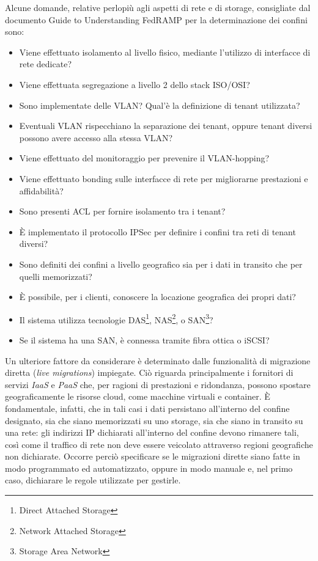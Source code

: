 \documentclass[../main.tex]{subfiles}
\begin{document}
Alcune domande, relative perlopiù agli aspetti di rete e di storage, consigliate dal documento Guide to Understanding FedRAMP per la determinazione dei confini sono:
\begin{itemize}
    \item Viene effettuato isolamento al livello fisico, mediante l'utilizzo di interfacce di rete dedicate?
    \item Viene effettuata segregazione a livello 2 dello stack ISO/OSI?
    \item Sono implementate delle VLAN? Qual'è la definizione di tenant utilizzata?
    \item Eventuali VLAN rispecchiano la separazione dei tenant, oppure tenant diversi possono avere accesso alla stessa VLAN?
    \item Viene effettuato del monitoraggio per prevenire il VLAN-hopping?
    \item Viene effettuato bonding sulle interfacce di rete per migliorarne prestazioni e affidabilità?
    \item Sono presenti ACL per fornire isolamento tra i tenant?
    \item È implementato il protocollo IPSec per definire i confini tra reti di tenant diversi?
    \item Sono definiti dei confini a livello geografico sia per i dati in transito che per quelli memorizzati?
    \item È possibile, per i clienti, conoscere la locazione geografica dei propri dati?
    \item Il sistema utilizza tecnologie DAS\footnote{Direct Attached Storage}, NAS\footnote{Network Attached Storage}, o SAN\footnote{Storage Area Network}?
    \item Se il sistema ha una SAN, è connessa tramite fibra ottica o iSCSI?
\end{itemize} 
        
Un ulteriore fattore da considerare è determinato dalle funzionalità di migrazione diretta (\textit{live migrations}) impiegate. Ciò riguarda principalmente i fornitori di servizi \textit{IaaS} e \textit{PaaS} che, per ragioni di prestazioni e ridondanza, possono spostare geograficamente le risorse cloud, come macchine virtuali e container.
È fondamentale, infatti, che in tali casi i dati persistano all'interno del confine designato, sia che siano memorizzati su uno storage, sia che siano in transito su una rete: gli indirizzi IP dichiarati all'interno del confine devono rimanere tali, così come il traffico di rete non deve essere veicolato attraverso regioni geografiche non dichiarate.
Occorre perciò specificare se le migrazioni dirette siano fatte in modo programmato ed automatizzato, oppure in modo manuale e, nel primo caso, dichiarare le regole utilizzate per gestirle.
\vfill
\newpage
\end{document}
